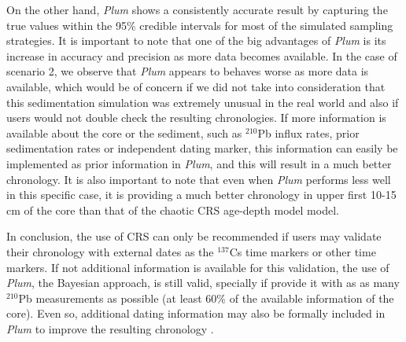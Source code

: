 \documentclass [10pt] {article}
\begin{document}
On the other hand, \textit{Plum} shows a consistently accurate result by capturing the true values within the 95\% credible intervals for most of the simulated sampling strategies. 
It is important to note that one of the big advantages of \textit{Plum} is its increase in accuracy and precision as more data becomes available.
In the case of scenario 2, we observe that \textit{Plum} appears to behaves worse as more data is available, which would be of concern if we did not take into consideration that this sedimentation simulation was extremely unusual in the real world and also if users would not double check the resulting chronologies. 
If more information is available about the core or the sediment, such as $^{210}$Pb influx rates, prior sedimentation rates or independent dating marker, this information can easily be implemented as prior information in \textit{Plum}, and this will result in a much better chronology.
It is also important to note that even when \textit{Plum} performs less well in this specific case, it is providing a much better chronology in upper first 10-15 cm of the core than that of the chaotic CRS age-depth model model.


In conclusion, the use of CRS can only be recommended if users may validate their chronology with external dates as the $^{137}$Cs time markers or other time markers. If not additional information is available for this validation, the use of \textit{Plum}, the Bayesian approach, is still valid, specially if provide it with as as many $^{210}$Pb measurements as possible (at least 60\% of the available information of the core).  Even so, additional dating information may also be formally included in \textit{Plum} to improve the resulting chronology \citep{Aquino2018,Aquino2020}. 




\newpage
\end{document}
